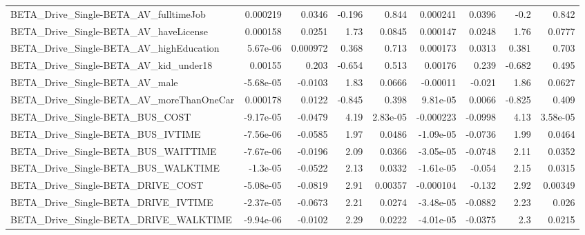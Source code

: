 \begin{tabular}{lrrrrrrrr}
BETA\_Drive\_Single-BETA\_AV\_fulltimeJob              &    0.000219 &       0.0346 &    -0.196 &    0.844 &   0.000241 &      0.0396 &         -0.2 &         0.842 \\
BETA\_Drive\_Single-BETA\_AV\_haveLicense              &    0.000158 &       0.0251 &      1.73 &   0.0845 &   0.000147 &      0.0248 &         1.76 &        0.0777 \\
BETA\_Drive\_Single-BETA\_AV\_highEducation            &    5.67e-06 &     0.000972 &     0.368 &    0.713 &   0.000173 &      0.0313 &        0.381 &         0.703 \\
BETA\_Drive\_Single-BETA\_AV\_kid\_under18              &     0.00155 &        0.203 &    -0.654 &    0.513 &    0.00176 &       0.239 &       -0.682 &         0.495 \\
BETA\_Drive\_Single-BETA\_AV\_male                     &   -5.68e-05 &      -0.0103 &      1.83 &   0.0666 &   -0.00011 &      -0.021 &         1.86 &        0.0627 \\
BETA\_Drive\_Single-BETA\_AV\_moreThanOneCar           &    0.000178 &       0.0122 &    -0.845 &    0.398 &   9.81e-05 &      0.0066 &       -0.825 &         0.409 \\
BETA\_Drive\_Single-BETA\_BUS\_COST                    &   -9.17e-05 &      -0.0479 &      4.19 & 2.83e-05 &  -0.000223 &     -0.0998 &         4.13 &      3.58e-05 \\
BETA\_Drive\_Single-BETA\_BUS\_IVTIME                  &   -7.56e-06 &      -0.0585 &      1.97 &   0.0486 &  -1.09e-05 &     -0.0736 &         1.99 &        0.0464 \\
BETA\_Drive\_Single-BETA\_BUS\_WAITTIME                &   -7.67e-06 &      -0.0196 &      2.09 &   0.0366 &  -3.05e-05 &     -0.0748 &         2.11 &        0.0352 \\
BETA\_Drive\_Single-BETA\_BUS\_WALKTIME                &    -1.3e-05 &      -0.0522 &      2.13 &   0.0332 &  -1.61e-05 &      -0.054 &         2.15 &        0.0315 \\
BETA\_Drive\_Single-BETA\_DRIVE\_COST                  &   -5.08e-05 &      -0.0819 &      2.91 &  0.00357 &  -0.000104 &      -0.132 &         2.92 &       0.00349 \\
BETA\_Drive\_Single-BETA\_DRIVE\_IVTIME                &   -2.37e-05 &      -0.0673 &      2.21 &   0.0274 &  -3.48e-05 &     -0.0882 &         2.23 &         0.026 \\
BETA\_Drive\_Single-BETA\_DRIVE\_WALKTIME              &   -9.94e-06 &      -0.0102 &      2.29 &   0.0222 &  -4.01e-05 &     -0.0375 &          2.3 &        0.0215 \\

\end{tabular}
